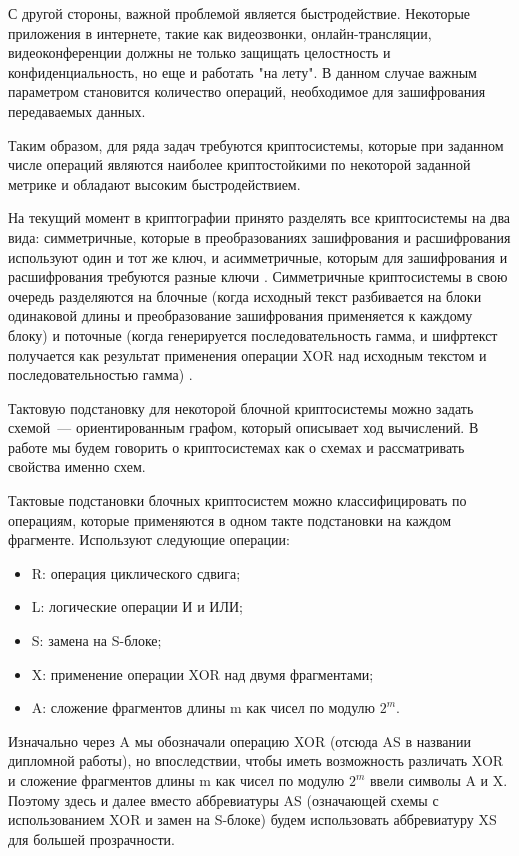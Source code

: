 \documentclass[a4paper,12pt]{report}
\theoremstyle{plain} %
\theoremstyle{definition}
\theoremstyle{remark}
\begin{document}
\begin{large}
С другой стороны, важной проблемой является быстродействие. Некоторые приложения в интернете, такие как видеозвонки, онлайн-трансляции, видеоконференции должны не только защищать целостность и конфиденциальность, но еще и работать "на лету". В данном случае важным параметром становится количество операций, необходимое для зашифрования передаваемых данных.

Таким образом, для ряда задач требуются криптосистемы, которые при заданном числе операций являются наиболее криптостойкими по некоторой заданной метрике и обладают высоким быстродействием.

На текущий момент в криптографии принято разделять все криптосистемы на два вида: симметричные, которые в преобразованиях зашифрования и расшифрования используют один и тот же ключ, и асимметричные, которым для зашифрования и расшифрования требуются разные ключи \cite{brassar}. Симметричные криптосистемы в свою очередь разделяются на блочные (когда исходный текст разбивается на блоки одинаковой длины и преобразование зашифрования применяется к каждому блоку) и поточные (когда генерируется последовательность гамма, и шифртекст получается как результат применения операции XOR над исходным текстом и последовательностью гамма) \cite{alferov}. 

Тактовую подстановку для некоторой блочной криптосистемы можно задать схемой~---
ориентированным графом, который описывает ход вычислений. В работе мы будем говорить о криптосистемах как о схемах и рассматривать свойства именно схем.

Тактовые подстановки блочных криптосистем можно классифицировать по операциям, которые применяются в одном такте подстановки на каждом фрагменте. Используют следующие операции:

\begin{itemize}
\item R: операция циклического сдвига;
\item L: логические операции И и ИЛИ;
\item S: замена на S-блоке;
\item X: применение операции XOR над двумя фрагментами;
\item A: сложение фрагментов длины m как чисел по модулю $2^m$.
\end{itemize}

Изначально через A мы обозначали операцию XOR (отсюда AS в названии дипломной работы), но впоследствии, чтобы иметь возможность различать XOR и сложение фрагментов длины m как чисел по модулю $2^m$ ввели символы A и X. Поэтому здесь и далее вместо аббревиатуры AS (означающей схемы с использованием XOR и замен на S-блоке) будем использовать аббревиатуру XS для большей прозрачности.


\end{large}
\end{document}
